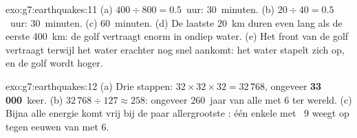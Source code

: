 \begin{solution}{exo:g7:earthquakes:11}
(a) $400 \div 800 = 0.5$~uur: 30~minuten. (b) $20 \div 40 = 0.5$~uur:
30~minuten. (c) 60~minuten. (d) De laatste \qty{20}{km} duren even lang
als de eerste \qty{400}{km}: de golf vertraagt enorm in ondiep water.
(e) Het front van de golf vertraagt terwijl het water erachter nog snel
aankomt: het water stapelt zich op, en de golf wordt hoger.
\end{solution}

\begin{solution}{exo:g7:earthquakes:12}
(a) Drie stappen: $32 \times 32 \times 32 = 32\,768$, ongeveer
\textbf{33\,000}~keer. (b) $32\,768 \div 127 \approx 258$: ongeveer
260~jaar van alle  met  6 ter wereld. (c) Bijna alle
energie komt vrij bij de paar allergrootste : één enkele
 met ~9 weegt op tegen eeuwen van  met
 6.
\end{solution}

